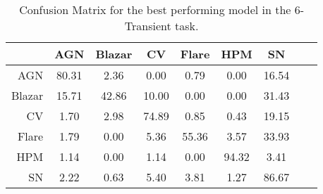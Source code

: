 \begin{table}
\centering
\begin{tabular}{|r|c|c|c|c|c|c|c|c|}
\hline
\multicolumn{1}{|l|}{} & AGN    & Blazar    & CV   & Flare   & HPM   & SN   \\ \hline \hline
AGN                & 80.31       & 2.36       & 0.00      & 0.79      & 0.00      & 16.54     \\ \hline
Blazar                & 15.71       & 42.86       & 10.00      & 0.00      & 0.00      & 31.43     \\ \hline
CV                & 1.70       & 2.98       & 74.89      & 0.85      & 0.43      & 19.15     \\ \hline
Flare                & 1.79       & 0.00       & 5.36      & 55.36      & 3.57      & 33.93     \\ \hline
HPM                & 1.14       & 0.00       & 1.14      & 0.00      & 94.32      & 3.41     \\ \hline
SN                & 2.22       & 0.63       & 5.40      & 3.81      & 1.27      & 86.67     \\ \hline
\end{tabular}
\caption{Confusion Matrix for the best performing model in the 6-Transient task.}
\label{Confusion-6-Transient}
\end{table}
